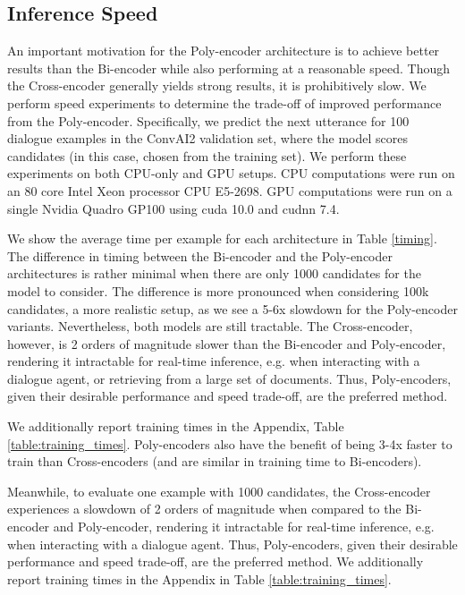 \documentclass{article} \usepackage{iclr2020_conference,times}
\begin{document}
\subsection{Inference Speed}
\label{section:timing}

An important motivation for the Poly-encoder architecture is to achieve better results than the Bi-encoder while also performing at a reasonable speed. Though the Cross-encoder generally yields strong results, it is prohibitively slow. We perform speed experiments to determine the trade-off of improved performance from the Poly-encoder. Specifically, we predict the next utterance for 100 dialogue examples in the ConvAI2 validation set, where the model scores  candidates (in this case, chosen from the training set). We perform these experiments on both CPU-only and  GPU setups. CPU computations were run on an 80 core Intel Xeon processor CPU E5-2698. GPU computations were run on a single  Nvidia Quadro GP100 using cuda 10.0 and cudnn 7.4.

We show the average time per example for each architecture 
in Table \ref{timing}. The difference in timing between the 
Bi-encoder and the Poly-encoder architectures is rather minimal when there are only 1000 candidates for the model to consider. The difference is more pronounced when considering 100k candidates, a more realistic setup, as we see a 5-6x slowdown for the Poly-encoder variants. Nevertheless, both models are still tractable. 
The Cross-encoder, however, is 2 orders of magnitude slower than the
Bi-encoder and Poly-encoder, rendering it intractable for real-time inference, e.g. when interacting with a dialogue agent, or retrieving from a large set of documents.   
Thus,  Poly-encoders, given their desirable performance and speed trade-off, are the preferred method.

We additionally report training times in the Appendix, Table \ref{table:training_times}. Poly-encoders also have the benefit of being
3-4x faster to train than Cross-encoders (and are similar in training time to Bi-encoders).  




Meanwhile, to evaluate one example with 1000 candidates, the Cross-encoder experiences a slowdown of 2 orders of magnitude when compared to the Bi-encoder and Poly-encoder, rendering it intractable for real-time inference, e.g. when interacting with a dialogue agent.
Thus, Poly-encoders, given their desirable performance and speed trade-off, are the preferred method. We additionally report training times in the Appendix in Table \ref{table:training_times}. \fi
\end{document}
